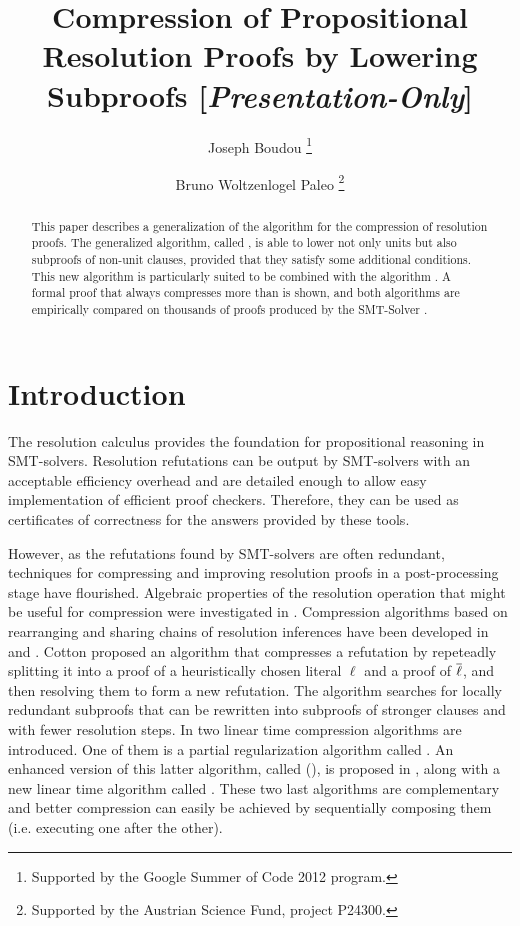 \documentclass{easychair}
\title{Compression of Propositional Resolution Proofs by Lowering Subproofs [\emph{\textbf{Presentation-Only}}]}
\author{
  Joseph Boudou\inst{1}
  \thanks{Supported by the Google Summer of Code 2012 program.}
  \and 
  Bruno Woltzenlogel Paleo\inst{2}
  \thanks{Supported by the Austrian Science Fund, project P24300.}
}
\institute{
  Universit\'e Paul Sabatier, Toulouse \\
  \email{joseph.boudou@matabio.net}
  \and 
  Vienna University of Technology \\
  \email{bruno@logic.at}
}
\begin{document}
\maketitle


\begin{abstract}
This paper describes a generalization of the {\LowerUnits} algorithm \cite{LURPI} for the
compression of resolution proofs.  The generalized algorithm, called
{\LowerUnivalents}, is able to lower not only units but also subproofs of non-unit clauses, provided
that they satisfy some additional conditions.  This new algorithm is particularly suited to be
combined with the {\RecyclePivotsIntersection} algorithm \cite{LURPI}.  A formal proof that
{\LowerUnivalents} always compresses more than {\LowerUnits} is shown, and both algorithms are
empirically compared on thousands of proofs produced by the SMT-Solver \veriT.
\end{abstract}

\setcounter{footnote}{0}

\section{Introduction}

The resolution calculus provides the foundation for propositional reasoning in SMT-solvers. Resolution refutations can be output by SMT-solvers with an acceptable efficiency overhead \cite{veriT} and are detailed enough to allow easy implementation of efficient proof checkers. Therefore, they can be used as certificates of correctness for the answers provided by these tools.

However, as the refutations found by SMT-solvers are often redundant, techniques for
compressing and improving resolution proofs in a post-processing stage have flourished.  Algebraic properties of the resolution
operation that might be useful for compression were investigated in \cite{bwp10}.
Compression algorithms based on rearranging and sharing chains of resolution inferences have been
developed in \cite{Amjad07} and \cite{Sinz}.  Cotton \cite{CottonSplit} proposed an algorithm that
compresses a refutation by repeteadly splitting it into a proof of a heuristically chosen literal $\ell$
and a proof of $\overline{\ell}$, and then resolving them to form a new refutation.  The {\ReduceReconstruct} algorithm \cite{RedRec} searches for locally redundant
subproofs that can be rewritten into subproofs of stronger clauses and with fewer resolution steps.
In \cite{RP08} two linear time compression algorithms are introduced. One of them is a partial
regularization algorithm called {\RecyclePivots}.  An enhanced version of this latter
algorithm, called {\RecyclePivotsIntersection} ({\RPI}), is proposed in \cite{LURPI},
along with a new linear time algorithm called {\LowerUnits}.  These two last algorithms are
complementary and better compression can easily be achieved by sequentially composing them (i.e.
executing one after the other).
\end{document}
